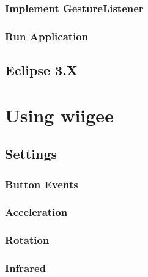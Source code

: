 \documentclass[%
   11pt,              %
   english,           %
   a4paper,           %
   DIV11,             %
   BCOR12mm,		  %
   titlepage,		  %
   bibtotoc,		  %
   liststotoc,		  %
   final,			  %
   twoside,			  %
   openright,		  %
   cleardoubleempty   %
]{scrreprt}%
\begin{document}
\subsection{Implement GestureListener}
\subsection{Run Application}


\section{Eclipse 3.X}


\chapter{Using wiigee}
\section{Settings}
\subsection{Button Events}

\subsection{Acceleration}

\subsection{Rotation}

\subsection{Infrared}
\end{document}
